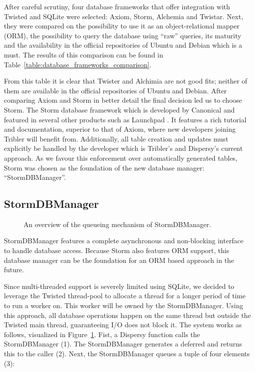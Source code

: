After careful scrutiny, four database frameworks that offer integration with Twisted and SQLite were selected: Axiom, Storm, Alchemia and Twistar.
Next, they were compared on the possibility to use it as an object-relational mapper (ORM), the possibility to query the database using \enquote{raw} queries, its maturity and the availability in the official repositories of Ubuntu and Debian which is a must.
The results of this comparison can be found in Table~\ref{table:database_frameworks_comparison}.

From this table it is clear that Twister and Alchimia are not good fits; neither of them are available in the official repositories of Ubuntu and Debian.
After comparing Axiom and Storm in better detail the final decision led us to choose Storm.
The Storm database framework which is developed by Canonical and featured in several other products such as Launchpad \cite{canonical2011storm}.
It features a rich tutorial and documentation, superior to that of Axiom, where new developers joining Tribler will benefit from.
Additionally, all table creation and updates must explicitly be handled by the developer which is Tribler's and Dispersy's current approach.
As we favour this enforcement over automatically generated tables, Storm was chosen as the foundation of the new database manager: \enquote{StormDBManager}.

\subsection{StormDBManager}

\begin{figure}[h]
	\caption{An overview of the queueing mechanism of StormDBManager.}
	\label{fig:storm_db_worker}
\end{figure}

StormDBManager features a complete asynchronous and non-blocking interface to handle database access.
Because Storm also features ORM support, this database manager can be the foundation for an ORM based approach in the future.

Since multi-threaded support is severely limited using SQLite, we decided to leverage the Twisted thread-pool to allocate a thread for a longer period of time to run a worker on.
This worker will be owned by the StormDBManager.
Using this approach, all database operations happen on the same thread but outside the Twisted main thread, guaranteeing I/O does not block it.
The system works as follows, visualized in Figure~\ref{fig:storm_db_worker}.
Fist, a Dispersy function calls the StormDBManager (1).
The StormDBManager generates a deferred and returns this to the caller (2).
Next, the StormDBManager queues a tuple of four elements (3):

